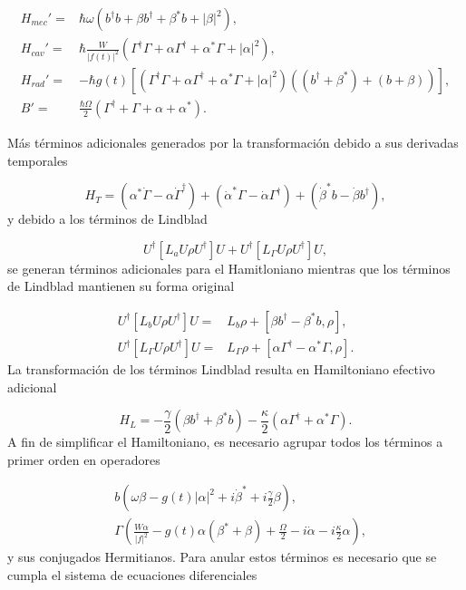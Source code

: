 \documentclass[10pt,a4paper]{report}
\begin{document}
\begin{align}
H_{mec}' =& \hbar \omega(b^{\dagger}b +\beta b^{\dagger}+\beta^* b + |\beta|^2),\\
H_{cav}' =& \hbar\frac{W}{|f(t)|^2}(\Gamma^{\dagger}\Gamma + \alpha \Gamma^{\dagger} + \alpha^* \Gamma + |\alpha|^2 ),\\
H_{rad}'=&-\hbar g(t)[(\Gamma^{\dagger}\Gamma + \alpha \Gamma^{\dagger} + \alpha^* \Gamma + |\alpha|^2 )((b^{\dagger}+\beta^*)+(b+\beta))],\\
B' =& \frac{\hbar \Omega}{2}(\Gamma^{\dagger} + \Gamma +\alpha + \alpha^*).
\end{align}

Más términos adicionales generados por la transformación debido a sus derivadas temporales

\begin{equation}
H_{T} = (\alpha^*\dot{\Gamma} - \alpha\dot{\Gamma}^\dagger) +(\dot{\alpha}^*\Gamma - \dot{\alpha}\Gamma^\dagger) +(\dot{\beta}^*b - \dot{\beta}b^\dagger),
\end{equation} y debido a los términos de Lindblad

\begin{equation}
U^\dagger [L_aU\rho U^\dagger]U + U^\dagger [L_\Gamma U\rho U^\dagger]U,
\end{equation} se generan términos adicionales para el Hamitloniano mientras que los términos de Lindblad mantienen su forma original

\begin{align}
U^\dagger [L_bU\rho U^\dagger]U=& L_b\rho + [\beta b^\dagger - \beta^* b,\rho],\\
U^\dagger [L_\Gamma U\rho U^\dagger]U =& L_\Gamma \rho + [ \alpha \Gamma^\dagger - \alpha^* \Gamma,\rho].
\end{align} La transformación de los términos Lindblad resulta en  Hamiltoniano efectivo adicional

\begin{equation}
H_L = -\frac{\gamma}{2}(\beta b^\dagger + \beta^* b) -\frac{\kappa}{2}( \alpha \Gamma^\dagger + \alpha^* \Gamma).
\end{equation} A fin de simplificar el Hamiltoniano, es necesario agrupar todos los términos a primer orden en operadores

\begin{align}
&b(\omega\beta - g(t)|\alpha|^2 + i\dot{\beta}^* + i\frac{\gamma}{2}\beta),\\
&\Gamma(\frac{W\alpha}{|f|^2} -g(t)\alpha(\beta^*+\beta) + \frac{\Omega}{2}-i\dot{\alpha} - i\frac{\kappa}{2}\alpha),
\end{align} y sus conjugados Hermitianos. Para anular estos términos es necesario que se cumpla el sistema de ecuaciones diferenciales
\end{document}
